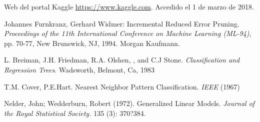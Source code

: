 % 

\begin{thebibliography}{99}

	\emph{} Web del portal Kaggle \url{https://www.kaggle.com}.  Accedido el 1 de marzo de 2018.
	
	
	\emph{}Johannes Furnkranz, Gerhard Widmer: Incremental Reduced Error Pruning. \textit{Proceedings of the 11th International Conference on Machine Learning (ML-94)}, pp. 70-77, New Brunswick, NJ, 1994. Morgan Kaufmann.

	\emph{}L. Breiman, J.H. Friedman, R.A. Olshen, , and C.J Stone. \textit{Classification and Regression Trees}. Wadsworth, Belmont, Ca, 1983	
		
	\emph{}T.M. Cover, P.E.Hart. Nearest Neighbor Pattern Classification. \textit{IEEE} (1967)
	
	\emph{}Nelder, John; Wedderburn, Robert (1972). Generalized Linear Models. \textit{Journal of the Royal Statistical Society.} 135 (3): 370?384.

\end{thebibliography}
